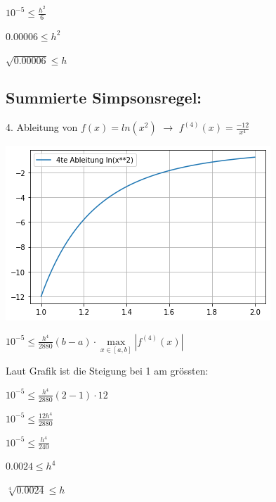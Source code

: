 \documentclass{article}
\begin{document}
\(10^{-5} \leq \frac{h^2}{6}\)

\(0.00006 \leq h^2\)

\(\sqrt{0.00006} \leq h\)

\newpage
\subsection*{Summierte Simpsonsregel:}
4. Ableitung von \(f(x) = ln(x^2)\) \(\rightarrow\) \(f^{(4)}(x) = \frac{-12}{x^4}\)

\includegraphics[scale=0.5]{4_diff.png}

\(10^{-5} \leq \frac{h^4}{2880}(b-a) \cdot \max\limits_{x \in [a,b]} |f^{(4)}(x)|\)

Laut Grafik ist die Steigung bei 1 am grössten:

\(10^{-5} \leq \frac{h^4}{2880}(2-1) \cdot 12\)

\(10^{-5} \leq \frac{12h^4}{2880}\)

\(10^{-5} \leq \frac{h^4}{240}\)

\(0.0024 \leq h^4\)

\(\sqrt[4]{0.0024} \leq h\)
\end{document}
